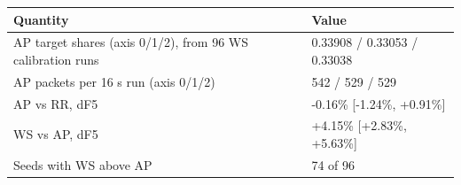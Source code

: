 \begin{tabular}{@{}ll@{}}
\toprule
Quantity & Value \\
\midrule
AP target shares (axis 0/1/2), from 96 WS calibration runs & 0.33908 / 0.33053 / 0.33038 \\
AP packets per 16 s run (axis 0/1/2) & 542 / 529 / 529 \\
AP vs RR, dF5 & -0.16\% [-1.24\%, +0.91\%] \\
WS vs AP, dF5 & +4.15\% [+2.83\%, +5.63\%] \\
Seeds with WS above AP & 74 of 96 \\
\bottomrule
\end{tabular}
